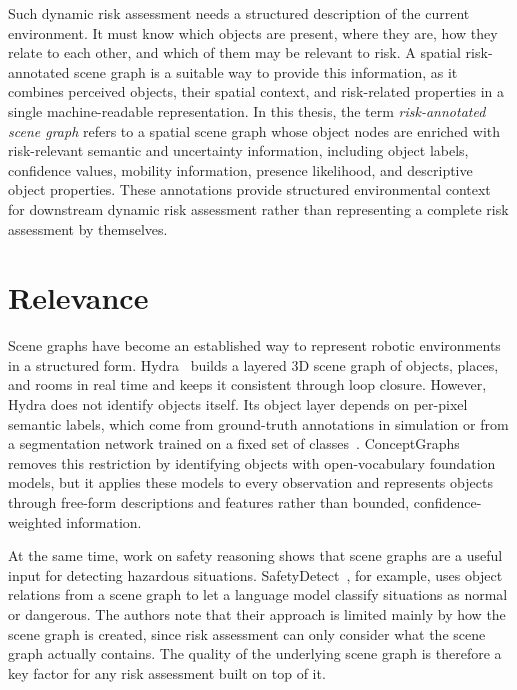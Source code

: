 {\small Such dynamic risk assessment needs a structured description of the current environment. It must know which objects are present, where they are, how they relate to each other, and which of them may be relevant to risk. A spatial risk-annotated scene graph is a suitable way to provide this information, as it combines perceived objects, their spatial context, and risk-related properties in a single machine-readable representation. In this thesis, the term \emph{risk-annotated scene graph} refers to a spatial scene graph whose object nodes are enriched with risk-relevant semantic and uncertainty information, including object labels, confidence values, mobility information, presence likelihood, and descriptive object properties. These annotations provide structured environmental context for downstream dynamic risk assessment rather than representing a complete risk assessment by themselves.\par}

\section{Relevance}

{\small Scene graphs have become an established way to represent robotic environments in a structured form. Hydra~\cite{hughes2022hydra} builds a layered 3D scene graph of objects, places, and rooms in real time and keeps it consistent through loop closure. However, Hydra does not identify objects itself. Its object layer depends on per-pixel semantic labels, which come from ground-truth annotations in simulation or from a segmentation network trained on a fixed set of classes~\cite{hughes2022hydra}. ConceptGraphs~\cite{gu2024conceptgraphs} removes this restriction by identifying objects with open-vocabulary foundation models, but it applies these models to every observation and represents objects through free-form descriptions and features rather than bounded, confidence-weighted information.\par}

{\small At the same time, work on safety reasoning shows that scene graphs are a useful input for detecting hazardous situations. SafetyDetect~\cite{mullen2024safetydetect}, for example, uses object relations from a scene graph to let a language model classify situations as normal or dangerous. The authors note that their approach is limited mainly by how the scene graph is created, since risk assessment can only consider what the scene graph actually contains. The quality of the underlying scene graph is therefore a key factor for any risk assessment built on top of it.\par}

